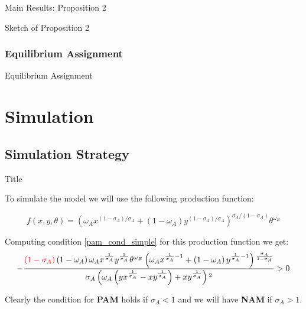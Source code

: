 \documentclass[notes,11pt, aspectratio=169]{beamer}
\newenvironment{wideitemize}{\itemize\addtolength{\itemsep}{10pt}}{\enditemize}
\begin{document}
\begin{frame}{Main Results: Proposition 2}
\end{frame}

\begin{frame}{Sketch of Proposition 2}
\end{frame}

\subsubsection{Equilibrium Assignment}
\begin{frame}{Equilibrium Assignment}
\end{frame}

\section{Simulation}
\subsection{Simulation Strategy}
\begin{frame}{Title}
	\begin{wideitemize}
		
		\item{} To simulate the model we will use the following production function:

			\begin{equation}\label{prod_funct}
				f(x,y,\theta) = \left(\omega_{A} x^{\left(1-\sigma_{A}\right) / \sigma_{A}}+\left(1-\omega_{A}\right) y^{\left(1-\sigma_{A}\right) / \sigma_{A}}\right)^{\sigma_{A} /\left(1-\sigma_{A}\right)} \theta^{\omega_{B}}
			\end{equation}
	
		\item{}	Computing condition \ref{pam_cond_simple} for this production function we get:
				\begin{equation}
					-\frac{\textcolor{red}{\left(1-\sigma _A\right)} \left(1-\omega _A\right) \omega
					_A x^{\frac{1}{\sigma _A}} y^{\frac{1}{\sigma _A}} \theta
				^{\omega _B} \left(\omega _A x^{\frac{1}{\sigma
				_A}-1}+\left(1-\omega_A\right) y^{\frac{1}{\sigma
				_A}-1}\right){}^{\frac{\sigma _A}{1-\sigma _A}}}{\sigma _A
				\left(\omega _A \left(y x^{\frac{1}{\sigma _A}}-x
				y^{\frac{1}{\sigma _A}}\right)+x y^{\frac{1}{\sigma
				_A}}\right){}^2} > 0
				\end{equation}
	
		\item{} Clearly the condition for \textbf{PAM} holds if $\sigma_A < 1$ and we will have \textbf{NAM} if $\sigma_A > 1$.
		\end{wideitemize}
\end{frame}
\end{document}
